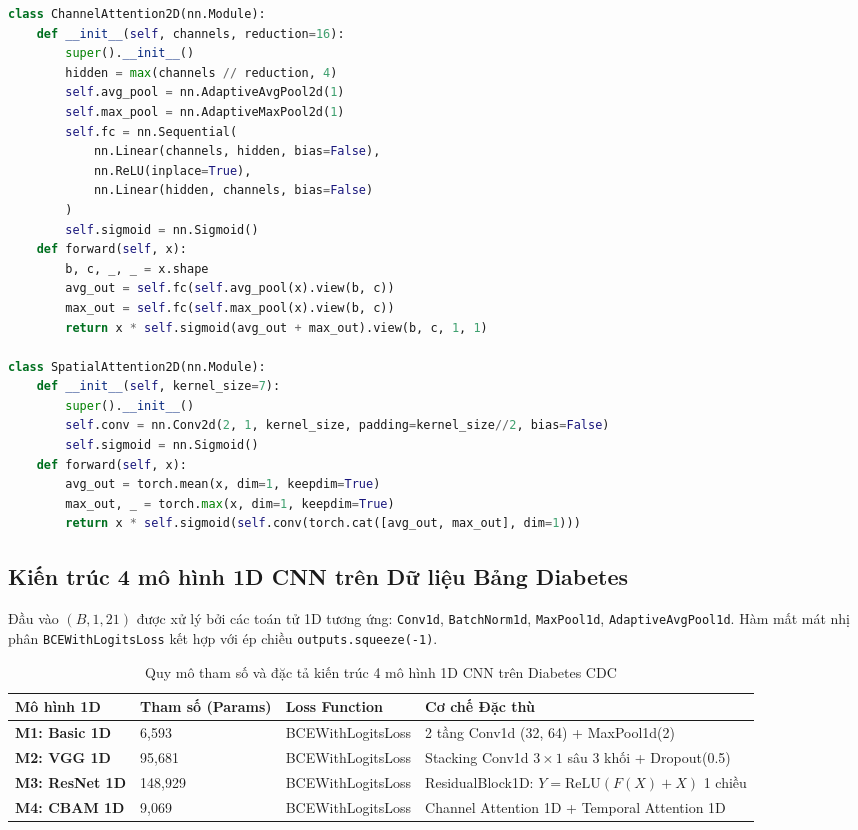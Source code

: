 \documentclass[12pt,a4paper]{article}
\begin{document}
\begin{lstlisting}[language=Python, caption={Cài đặt khối CBAM (Channel \& Spatial Attention) trên PyTorch}]
class ChannelAttention2D(nn.Module):
    def __init__(self, channels, reduction=16):
        super().__init__()
        hidden = max(channels // reduction, 4)
        self.avg_pool = nn.AdaptiveAvgPool2d(1)
        self.max_pool = nn.AdaptiveMaxPool2d(1)
        self.fc = nn.Sequential(
            nn.Linear(channels, hidden, bias=False),
            nn.ReLU(inplace=True),
            nn.Linear(hidden, channels, bias=False)
        )
        self.sigmoid = nn.Sigmoid()
    def forward(self, x):
        b, c, _, _ = x.shape
        avg_out = self.fc(self.avg_pool(x).view(b, c))
        max_out = self.fc(self.max_pool(x).view(b, c))
        return x * self.sigmoid(avg_out + max_out).view(b, c, 1, 1)

class SpatialAttention2D(nn.Module):
    def __init__(self, kernel_size=7):
        super().__init__()
        self.conv = nn.Conv2d(2, 1, kernel_size, padding=kernel_size//2, bias=False)
        self.sigmoid = nn.Sigmoid()
    def forward(self, x):
        avg_out = torch.mean(x, dim=1, keepdim=True)
        max_out, _ = torch.max(x, dim=1, keepdim=True)
        return x * self.sigmoid(self.conv(torch.cat([avg_out, max_out], dim=1)))
\end{lstlisting}

\subsection{Kiến trúc 4 mô hình 1D CNN trên Dữ liệu Bảng Diabetes}
Đầu vào $(B, 1, 21)$ được xử lý bởi các toán tử 1D tương ứng: \texttt{Conv1d}, \texttt{BatchNorm1d}, \texttt{MaxPool1d}, \texttt{AdaptiveAvgPool1d}. Hàm mất mát nhị phân \texttt{BCEWithLogitsLoss} kết hợp với ép chiều \texttt{outputs.squeeze(-1)}.

\begin{table}[htbp]
\centering
\small
\begin{tabularx}{\textwidth}{l C{2.5cm} C{3.0cm} X}
\toprule
\textbf{Mô hình 1D} & \textbf{Tham số (Params)} & \textbf{Loss Function} & \textbf{Cơ chế Đặc thù} \\
\midrule
\textbf{M1: Basic 1D} & 6,593 & BCEWithLogitsLoss & 2 tầng Conv1d (32, 64) + MaxPool1d(2) \\
\textbf{M2: VGG 1D} & 95,681 & BCEWithLogitsLoss & Stacking Conv1d $3 \times 1$ sâu 3 khối + Dropout(0.5) \\
\textbf{M3: ResNet 1D} & 148,929 & BCEWithLogitsLoss & ResidualBlock1D: $Y = \text{ReLU}(F(X) + X)$ 1 chiều \\
\textbf{M4: CBAM 1D} & 9,069 & BCEWithLogitsLoss & Channel Attention 1D + Temporal Attention 1D \\
\bottomrule
\end{tabularx}
\caption{Quy mô tham số và đặc tả kiến trúc 4 mô hình 1D CNN trên Diabetes CDC}
\label{tab:models_1d_spec}
\end{table}
\end{document}
